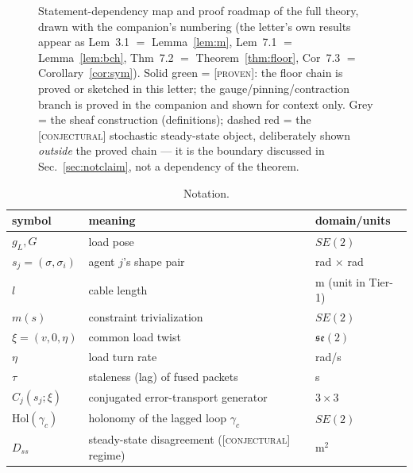 \documentclass[letterpaper, 10pt, journal]{IEEEtran}
\newcommand{\provtag}{\textsc{[proven]}}
\newcommand{\conjtag}{\textsc{[conjectural]}}
\begin{document}
\begin{figure}[t]
  \centering
  \resizebox{\linewidth}{!}{}
  \caption{Statement-dependency map and proof roadmap of the full theory,
  drawn with the companion's numbering (the letter's own results appear as
  Lem~3.1 $=$ Lemma~\ref{lem:m}, Lem~7.1 $=$ Lemma~\ref{lem:bch}, Thm~7.2
  $=$ Theorem~\ref{thm:floor}, Cor~7.3 $=$ Corollary~\ref{cor:sym}). Solid
  green = \provtag{}: the floor chain is proved or sketched in this letter;
  the gauge/pinning/contraction branch is proved in the companion and shown
  for context only. Grey = the sheaf construction (definitions); dashed red
  = the \conjtag{} stochastic steady-state object, deliberately shown
  \emph{outside} the proved chain --- it is the boundary discussed in
  Sec.~\ref{sec:notclaim}, not a dependency of the theorem.}
  \label{fig:thmmap}
\end{figure}

\begin{table}[t]
\centering
\caption{Notation.}
\label{tab:notation}
\begin{tabular}{lll}
\toprule
symbol & meaning & domain/units \\
\midrule
$g_L, G$ & load pose & $SE(2)$ \\
$s_j = (\sigma, \sigma_i)$ & agent $j$'s shape pair & rad $\times$ rad \\
$l$ & cable length & m (unit in Tier-1) \\
$m(s)$ & constraint trivialization & $SE(2)$ \\
$\xi = (v, 0, \eta)$ & common load twist & $\mathfrak{se}(2)$ \\
$\eta$ & load turn rate & rad/s \\
$\tau$ & staleness (lag) of fused packets & s \\
$C_j(s_j;\xi)$ & conjugated error-transport generator & $3{\times}3$ \\
$\mathrm{Hol}(\gamma_c)$ & holonomy of the lagged loop $\gamma_c$ & $SE(2)$ \\
$D_{ss}$ & steady-state disagreement (\conjtag{} regime) & m$^2$ \\
\bottomrule
\end{tabular}
\end{table}
\end{document}
